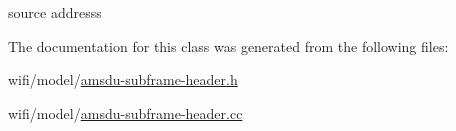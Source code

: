source addresss 



The documentation for this class was generated from the following files\+:\begin{DoxyCompactItemize}
\item 
wifi/model/\hyperlink{amsdu-subframe-header_8h}{amsdu-\/subframe-\/header.\+h}\item 
wifi/model/\hyperlink{amsdu-subframe-header_8cc}{amsdu-\/subframe-\/header.\+cc}\end{DoxyCompactItemize}
